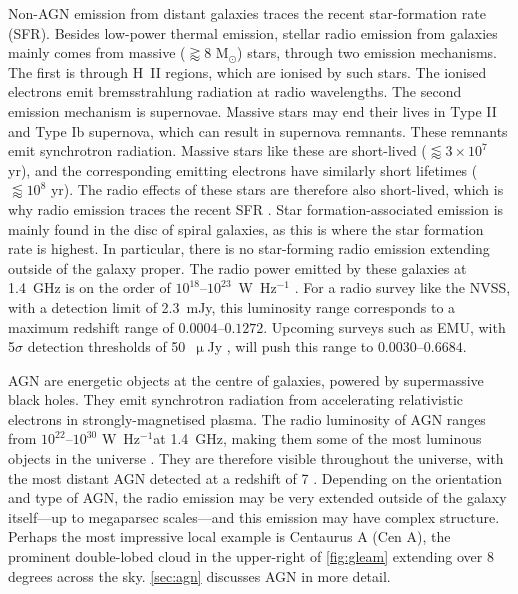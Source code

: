     Non-AGN emission from distant galaxies traces the recent star-formation rate (SFR). Besides low-power thermal emission, stellar radio emission from galaxies mainly comes from massive ($\gtrapprox 8$ M$_\odot$) stars, through two emission mechanisms. The first is through H~II regions, which are ionised by such stars. The ionised electrons emit bremsstrahlung radiation at radio wavelengths. The second emission mechanism is supernovae. Massive stars may end their lives in Type II and Type Ib supernova, which can result in supernova remnants. These remnants emit synchrotron radiation. Massive stars like these are short-lived ($\lessapprox 3 \times 10^7$ yr), and the corresponding emitting electrons have similarly short lifetimes ($\lessapprox 10^8$ yr). The radio effects of these stars are therefore also short-lived, which is why radio emission traces the recent SFR \citep{condon_radio_1992}. Star formation-associated emission is mainly found in the disc of spiral galaxies, as this is where the star formation rate is highest. In particular, there is no star-forming radio emission extending outside of the galaxy proper. The radio power emitted by these galaxies at 1.4~GHz is on the order of $10^{18}$--$10^{23}$~W~Hz$^{-1}$ \citep{condon_radio_1992}. For a radio survey like the NVSS, with a detection limit of 2.3~mJy, this luminosity range corresponds to a maximum redshift range of $0.0004$--$0.1272$. Upcoming surveys such as EMU, with 5$\sigma$ detection thresholds of 50~$\upmu${}Jy \citep{norris_emu_2011}, will push this range to $0.0030$--$0.6684$.

    AGN are energetic objects at the centre of galaxies, powered by supermassive black holes. They emit synchrotron radiation from accelerating relativistic electrons in strongly-magnetised plasma. The radio luminosity of AGN ranges from $10^{22}$--$10^{30}$ W~Hz$^{-1}$\citeneeded at 1.4~GHz, making them some of the most luminous objects in the universe \citeneeded. They are therefore visible throughout the universe, with the most distant AGN detected at a redshift of 7 \citeneeded. Depending on the orientation and type of AGN, the radio emission may be very extended outside of the galaxy itself---up to megaparsec scales---and this emission may have complex structure. Perhaps the most impressive local example is Centaurus A (Cen A), the prominent double-lobed cloud in the upper-right of \autoref{fig:gleam} extending over 8 degrees across the sky. \autoref{sec:agn} discusses AGN in more detail.

